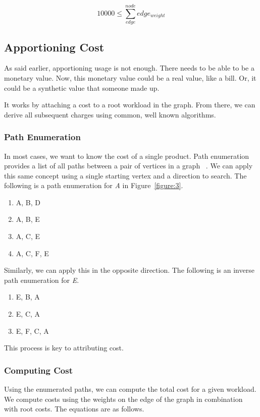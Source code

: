 \documentclass[10pt, a4paper, twocolumn]{article}
\begin{document}
    \[ 10000 \leq \sum_{edge}^{node} edge_{weight} \]

  \subsection*{Apportioning Cost}
    As said earlier, apportioning usage is not enough.
    There needs to be able to be a monetary value.
    Now, this monetary value could be a real value, like a bill.
    Or, it could be a synthetic value that someone made up.

    It works by attaching a cost to a root workload in the graph.
    From there, we can derive all subsequent charges using common, well known algorithms.

    \subsubsection*{Path Enumeration}
      In most cases, we want to know the cost of a single product.
      Path enumeration provides a list of all paths between a pair of vertices in a graph ~\cite{Grossi2016}.
      We can apply this same concept using a single starting vertex and a direction to search.
      The following is a path enumeration for \textit{A} in Figure~\ref{figure:3}.

      \begin{enumerate}
        \item A, B, D
        \item A, B, E
        \item A, C, E
        \item A, C, F, E
      \end{enumerate}

      Similarly, we can apply this in the opposite direction.
      The following is an inverse path enumeration for \textit{E}.

      \begin{enumerate}
        \item E, B, A
        \item E, C, A
        \item E, F, C, A
      \end{enumerate}

      This process is key to attributing cost.

    \subsubsection*{Computing Cost}
      Using the enumerated paths, we can compute the total cost for a given workload.
      We compute costs using the weights on the edge of the graph in combination with root costs.
      The equations are as follows.
\end{document}
